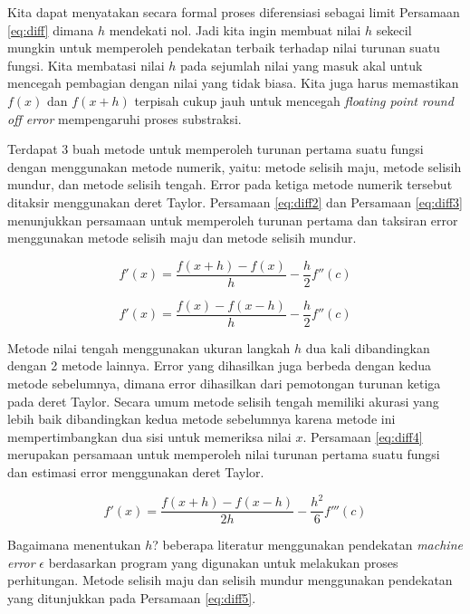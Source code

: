 \documentclass[
]{book}
\theoremstyle{definition}
\theoremstyle{definition}
\theoremstyle{definition}
\theoremstyle{definition}
\theoremstyle{remark}
\begin{document}
Kita dapat menyatakan secara formal proses diferensiasi sebagai limit Persamaan \eqref{eq:diff} dimana \(h\) mendekati nol. Jadi kita ingin membuat nilai \(h\) sekecil mungkin untuk memperoleh pendekatan terbaik terhadap nilai turunan suatu fungsi. Kita membatasi nilai \(h\) pada sejumlah nilai yang masuk akal untuk mencegah pembagian dengan nilai yang tidak biasa. Kita juga harus memastikan \(f\left(x\right)\) dan \(f\left(x+h\right)\) terpisah cukup jauh untuk mencegah \emph{floating point round off error} mempengaruhi proses substraksi.

Terdapat 3 buah metode untuk memperoleh turunan pertama suatu fungsi dengan menggunakan metode numerik, yaitu: metode selisih maju, metode selisih mundur, dan metode selisih tengah. Error pada ketiga metode numerik tersebut ditaksir menggunakan deret Taylor. Persamaan \eqref{eq:diff2} dan Persamaan \eqref{eq:diff3} menunjukkan persamaan untuk memperoleh turunan pertama dan taksiran error menggunakan metode selisih maju dan metode selisih mundur.

\begin{equation}
f'\left(x\right) = \frac{f\left(x+h\right)-f\left(x\right)}{h} - \frac{h}{2} f''\left(c\right)
  \label{eq:diff2}
\end{equation}

\begin{equation}
f'\left(x\right) = \frac{f\left(x\right)-f\left(x-h\right)}{h} - \frac{h}{2} f''\left(c\right)
  \label{eq:diff3}
\end{equation}

Metode nilai tengah menggunakan ukuran langkah \(h\) dua kali dibandingkan dengan 2 metode lainnya. Error yang dihasilkan juga berbeda dengan kedua metode sebelumnya, dimana error dihasilkan dari pemotongan turunan ketiga pada deret Taylor. Secara umum metode selisih tengah memiliki akurasi yang lebih baik dibandingkan kedua metode sebelumnya karena metode ini mempertimbangkan dua sisi untuk memeriksa nilai \(x\). Persamaan \eqref{eq:diff4} merupakan persamaan untuk memperoleh nilai turunan pertama suatu fungsi dan estimasi error menggunakan deret Taylor.

\begin{equation}
f'\left(x\right) = \frac{f\left(x+h\right)-f\left(x-h\right)}{2h} - \frac{h^2}{6} f'''\left(c\right)
  \label{eq:diff4}
\end{equation}

Bagaimana menentukan \(h\)? beberapa literatur menggunakan pendekatan \emph{machine error} \(\epsilon\) berdasarkan program yang digunakan untuk melakukan proses perhitungan. Metode selisih maju dan selisih mundur menggunakan pendekatan yang ditunjukkan pada Persamaan \eqref{eq:diff5}.
\end{document}
